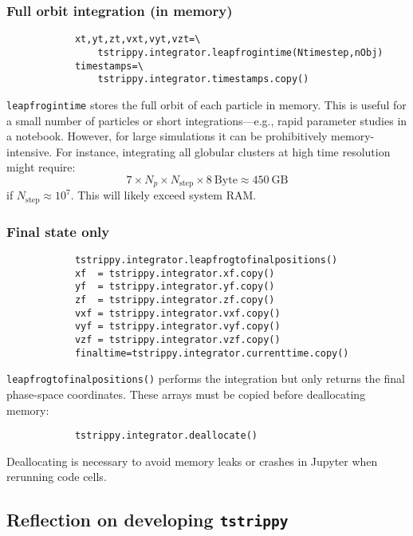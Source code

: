 \documentclass{article}
\begin{document}
        \subsubsection*{Full orbit integration (in memory)}
        \small
        \begin{lstlisting}
            xt,yt,zt,vxt,vyt,vzt=\
                tstrippy.integrator.leapfrogintime(Ntimestep,nObj) 
            timestamps=\
                tstrippy.integrator.timestamps.copy()
        \end{lstlisting}
        \normalsize
        \texttt{leapfrogintime} stores the full orbit of each particle in memory. This is useful for a small number of particles or short integrations—e.g., rapid parameter studies in a notebook. However, for large simulations it can be prohibitively memory-intensive. For instance, integrating all globular clusters at high time resolution might require:
        \begin{equation}
            7 \times N_p \times N_\mathrm{step} \times 8~\mathrm{Byte} \approx 450~\mathrm{GB}
        \end{equation}
        if $N_\mathrm{step} \approx 10^7$. This will likely exceed system RAM.

        \subsubsection*{Final state only}
        \small
        \begin{lstlisting}
            tstrippy.integrator.leapfrogtofinalpositions()
            xf  = tstrippy.integrator.xf.copy()
            yf  = tstrippy.integrator.yf.copy()
            zf  = tstrippy.integrator.zf.copy()
            vxf = tstrippy.integrator.vxf.copy()
            vyf = tstrippy.integrator.vyf.copy()
            vzf = tstrippy.integrator.vzf.copy()
            finaltime=tstrippy.integrator.currenttime.copy()
        \end{lstlisting}
        \normalsize
        \texttt{leapfrogtofinalpositions()} performs the integration but only returns the final phase-space coordinates. These arrays must be copied before deallocating memory:
        \small
        \begin{lstlisting}
            tstrippy.integrator.deallocate()
        \end{lstlisting}
        \normalsize
        Deallocating is necessary to avoid memory leaks or crashes in Jupyter when rerunning code cells.

    \subsection{Reflection on developing \texttt{tstrippy}}
\end{document}
